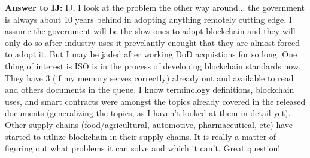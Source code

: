 \textbf{Answer to IJ:} IJ, I look at the problem the other way around... the government is always about 10 years behind in adopting anything remotely cutting edge. I assume the government will be the slow ones to adopt blockchain and they will only do so after industry uses it prevelantly enought that they are almost forced to adopt it.  But I may be jaded after working DoD acquistions for so long.  One thing of interest is ISO is in the process of developing blockchain standards now.  They have 3 (if my memory serves correctly) already out and available to read and others documents in the queue.  I know terminology definitions, blockchain uses, and smart contracts were amongst the topics already covered in the released documents (generalizing the topics, as I haven't looked at them in detail yet). Other supply chains (food/agricultural, automotive, pharmaceutical, etc) have started to utliize blockchain in their supply chains.  It is really a matter of figuring out what problems it can solve and which it can't.  Great question!
